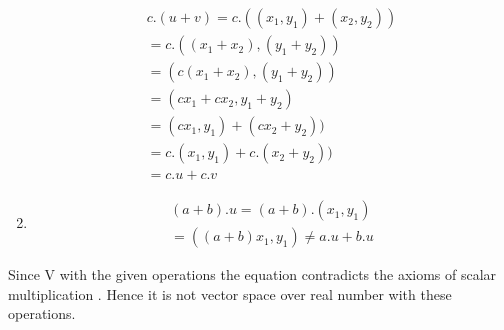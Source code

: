 \documentclass[journal,12pt,twocolumn]{IEEEtran}
\begin{document}
\begin{enumerate}
 \begin{align}
 c.(u+v)=c.((x_1,y_1)+(x_2,y_2))\\
 =c.((x_1+x_2),(y_1+y_2))\\
 =(c(x_1+x_2),(y_1+y_2))\\
 =(cx_1+cx_2,y_1+y_2)\\
 =(cx_1,y_1)+(cx_2+y_2))\\
 =c.(x_1,y_1)+c.(x_2+y_2))\\
 =c.u+c.v
 \end{align}
 \item
 \begin{align}
 (a+b).u=(a+b).(x_1,y_1)\\
 =((a+b)x_1,y_1)\neq a.u+b.u\label{contradict}
 \end{align}
\end{enumerate}
Since V with the given operations the equation   contradicts the axioms of scalar multiplication . Hence it is not vector space over real number with these operations.
\end{document}
